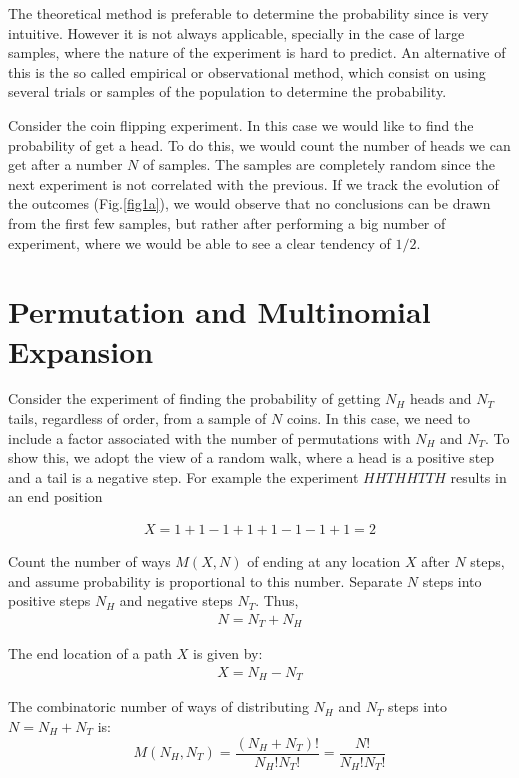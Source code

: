 \documentclass[book.tex]{subfiles}
\begin{document}
The theoretical method is preferable to determine the probability since is very intuitive. However it is not always applicable, specially in the case of large samples, where the nature of the experiment is hard to predict. An alternative of this is the so called empirical or observational method, which consist on using several trials or samples of the population to determine the probability. 

Consider the coin flipping experiment. In this case we would like to find the probability of get a head. To do this, we would count the number of heads we can get after a number $N$ of samples. The samples are completely random since the next experiment is not correlated with the previous. If we track the evolution of the outcomes (Fig.\ref{fig1a}), we would observe that no conclusions can be drawn from the first few samples, but rather after performing a big number of experiment, where we would be able to see a clear tendency of $1/2$.

\section{Permutation and Multinomial Expansion}

Consider the experiment of finding the probability of getting $N_H$ heads and $N_T$ tails, regardless of order, from a sample of $N$ coins. In this case, we need to include a factor associated with the number of permutations with $N_H$ and $N_T$. To show this, we adopt the view of a random walk, where a head is a positive step and a tail is a negative step. For example the experiment $HHTHHTTH$ results in an end position 

\begin{align}
X = 1+1-1+1+1-1-1+1 = 2
\end{align}

Count the number of ways $M(X,N)$ of ending at any location $X$ after $N$ steps, and assume probability is proportional to this number. Separate $N$ steps into positive steps $N_H$ and negative steps $N_T$. Thus,
\begin{align}\label{Eq1}
N = N_T + N_H
\end{align}

The end location of a path $X$ is given by:
\begin{align}\label{Eq2}
X = N_H - N_T
\end{align}

The combinatoric number of ways of distributing $N_H$ and $N_T$ steps into $N = N_H + N_T$ is:
\begin{equation}\label{Eq3}
M(N_H,N_T)=\frac{(N_H+N_T)!}{N_H!N_T!}=\frac{N!}{N_H!N_T!}
\end{equation}
\end{document}
